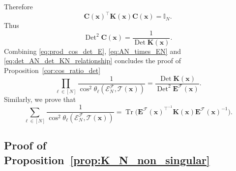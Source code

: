 \documentclass[twoside,11pt]{book}
\numberwithin{theorem}{chapter}
\numberwithin{definition}{chapter}
\numberwithin{proposition}{chapter}
\numberwithin{corollary}{chapter}
\numberwithin{example}{chapter}
\numberwithin{lemma}{chapter}
\numberwithin{assumption}{chapter}
\numberwithin{equation}{chapter}
\numberwithin{figure}{chapter}
\DeclareMathOperator{\Tr}{Tr}
\DeclareMathOperator{\Det}{Det}
\DeclareMathOperator{\Tran}{\intercal}
\begin{document}
Therefore
\begin{equation}
\bm{C}(\bm{x})^{\Tran} \bm{K}(\bm{x}) \bm{C}(\bm{x}) = \mathbb{I}_{N}.
\end{equation}
Thus
\begin{equation}\label{eq:det_AN_det_KN_relationship}
\Det^{2} \bm{C}(\bm{x}) = \frac{1}{\Det \bm{K}(\bm{x})}.
\end{equation}
Combining \eqref{eq:prod_cos_det_E}, \eqref{eq:AN_times_EN} and \eqref{eq:det_AN_det_KN_relationship} concludes the proof of Proposition~\ref{cor:cos_ratio_det}
\begin{equation}
\prod\limits_{\ell \in [N]} \frac{1}{\cos^{2} \theta_{\ell} \left(\mathcal{E}^{\mathcal{F}}_{N}, \mathcal{T}(\bm{x}) \right)} = \frac{\Det \bm{K}(\bm{x})}{\Det^{2} \bm{E}^{\mathcal{F}}(\bm{x})}.
\end{equation}
Similarly, we prove that
\begin{equation}
\sum\limits_{\ell \in [N]} \frac{1}{\cos^{2} \theta_{\ell} \left(\mathcal{E}^{\mathcal{F}}_{N}, \mathcal{T}(\bm{x}) \right)} = \Tr \bigg(\bm{E}^{\mathcal{F}}(\bm{x})^{\Tran^{-1}}  \bm{K}(\bm{x}) \bm{E}^{\mathcal{F}}(\bm{x})^{-1} \bigg).
\end{equation}


\subsection{Proof of Proposition~\ref{prop:K_N_non_singular}}\label{app:K_N_non_singular}
\end{document}

